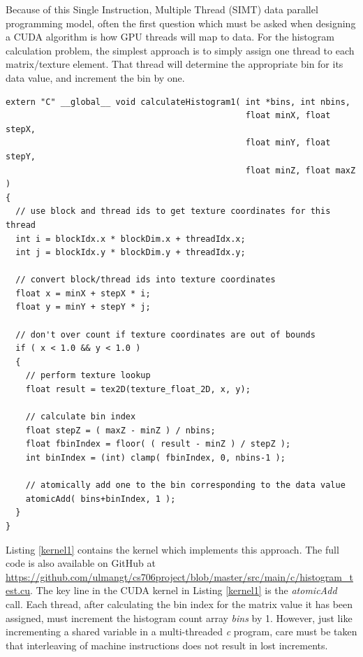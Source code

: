 \documentclass{article}
\begin{document}
Because of this Single Instruction, Multiple Thread (SIMT) data parallel programming model, often the first question which must be asked when designing a CUDA algorithm is how GPU threads will map to data. For the histogram calculation problem, the simplest approach is to simply assign one thread to each matrix/texture element. That thread will determine the appropriate bin for its data value, and increment the bin by one.

\lstset{language=C,basicstyle=\footnotesize}
\begin{minipage}{\textwidth}
\begin{lstlisting}[caption={calculateHistogram1: Global Memory atomicAdd},label={kernel1}]
extern "C" __global__ void calculateHistogram1( int *bins, int nbins,
                                                float minX, float stepX,
                                                float minY, float stepY,
                                                float minZ, float maxZ )
{
  // use block and thread ids to get texture coordinates for this thread
  int i = blockIdx.x * blockDim.x + threadIdx.x;
  int j = blockIdx.y * blockDim.y + threadIdx.y;

  // convert block/thread ids into texture coordinates
  float x = minX + stepX * i;
  float y = minY + stepY * j;

  // don't over count if texture coordinates are out of bounds
  if ( x < 1.0 && y < 1.0 )
  {
    // perform texture lookup
    float result = tex2D(texture_float_2D, x, y);

    // calculate bin index
    float stepZ = ( maxZ - minZ ) / nbins;
    float fbinIndex = floor( ( result - minZ ) / stepZ );
    int binIndex = (int) clamp( fbinIndex, 0, nbins-1 );

    // atomically add one to the bin corresponding to the data value
    atomicAdd( bins+binIndex, 1 );
  }
}
\end{lstlisting}
\end{minipage}

Listing \ref{kernel1} contains the kernel which implements this approach. The full code is also available on GitHub at \url{https://github.com/ulmangt/cs706project/blob/master/src/main/c/histogram_test.cu}. The key line in the CUDA kernel in Listing \ref{kernel1} is the \emph{atomicAdd} call. Each thread, after calculating the bin index for the matrix value it has been assigned, must increment the histogram count array \emph{bins} by 1. However, just like incrementing a shared variable in a multi-threaded \emph{c} program, care must be taken that interleaving of machine instructions does not result in lost increments.
\end{document}
